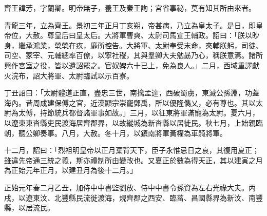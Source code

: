\begin{pinyinscope}
 
 
 齊王諱芳，字蘭卿。明帝無子，養王及秦王詢；宮省事祕，莫有知其所由來者。
 
 
 青龍三年，立為齊王。景初三年正月丁亥朔，帝甚病，乃立為皇太子。是日，即皇帝位，大赦。尊皇后曰皇太后。大將軍曹爽、太尉司馬宣王輔政。詔曰：「朕以眇身，繼承鴻業，煢煢在疚，靡所控告。大將軍、太尉奉受末命，夾輔朕躬，司徒、司空、冢宰、元輔總率百僚，以寧社稷，其與羣卿大夫勉勗乃心，稱朕意焉。諸所興作宮室之役，皆以遺詔罷之。官奴婢六十已上，免為良人。」二月，西域重譯獻火浣布，詔大將軍、太尉臨試以示百寮。
 
 
 
 
 丁丑詔曰：「太尉體道正直，盡忠三世，南擒孟達，西破蜀虜，東滅公孫淵，功蓋海內。昔周成建保傅之官，近漢顯宗崇寵鄧禹，所以優隆儁乂，必有尊也。其以太尉為太傅，持節統兵都督諸軍事如故。」三月，以征東將軍滿寵為太尉。夏六月，以遼東東沓縣吏民渡海居齊郡界，以故縱城為新沓縣以居徙民。秋七月，上始親臨朝，聽公卿奏事。八月，大赦。冬十月，以鎮南將軍黃權為車騎將軍。
 
 
 
 
 十二月，詔曰：「烈祖明皇帝以正月棄背天下，臣子永惟忌日之哀，其復用夏正；雖違先帝通三統之義，斯亦禮制所由變改也。又夏正於數為得天正，其以建寅之月為正始元年正月，以建丑月為後十二月。」
 
 
 
 
 正始元年春二月乙丑，加侍中中書監劉放、侍中中書令孫資為左右光祿大夫。丙戌，以遼東汶、北豐縣民流徙渡海，規齊郡之西安、臨菑、昌國縣界為新汶、南豐縣，以居流民。
 

\end{pinyinscope}
